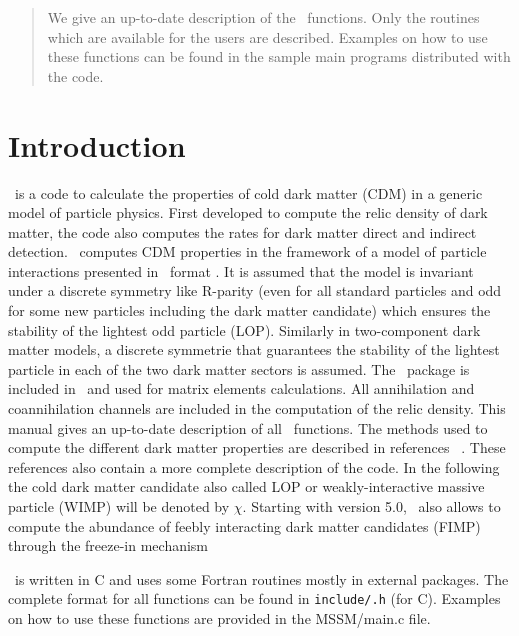 \documentclass[12pt,a4paper]{article}
\begin{document}
\begin{abstract}
We give an up-to-date description of the \micro\ functions. Only the routines which are available for
the users are described.  Examples on how to use these functions
can be found in the sample main programs distributed with the code. 
\end{abstract}





\tableofcontents

\newpage



\section{Introduction}
\micro\ is a code 
 to calculate the properties of cold dark matter (CDM)  in a generic model of particle physics.  
 First developed to compute the relic density of dark matter, 
 the code also computes the rates for dark matter direct and  indirect detection. 
 \micro\ computes CDM properties in the framework of a model of particle
 interactions presented in \calchep\ format \cite{Pukhov:2004ca}. 
 It is assumed that the model is invariant under  a discrete symmetry like R-parity (even for 
all standard particles and odd for some new particles including the dark matter candidate) which ensures 
the stability of the lightest  odd particle (LOP).  Similarly in two-component dark matter models,  a discrete symmetrie that guarantees the stability of the lightest particle in each of the two dark matter sectors  is assumed.
 The \calchep\  package is included in \micro\ and used for matrix elements calculations.
All annihilation and coannihilation channels are included in the computation of the relic density. 
This manual gives an up-to-date description of all \micro\ functions.  
The methods used to compute the different dark matter properties are described 
in references 
~\cite{Belanger:2001fz,Belanger:2004yn,Belanger:2006is,Belanger:2008sj,Belanger:2010gh,Belanger:2013oya,Belanger:2014vza,Barducci:2016pcb,Belanger:2018ccd}.
These references also contain  a more complete description of the code. In the following
the cold dark matter candidate also called LOP or weakly-interactive massive particle (WIMP)
will be denoted by $\chi$. 
Starting with version 5.0, \micro\ also allows to  compute
the abundance of feebly interacting dark matter candidates (FIMP) through the freeze-in
mechanism ~\cite{Belanger:2018ccd}


\micro\ is written in  C  and uses some Fortran routines mostly in external packages. 
The complete format  for all functions can be found in
\verb|include/.h| (for C). Examples on how to use these functions are provided   
in the MSSM/main.c file. 
 
\end{document}
